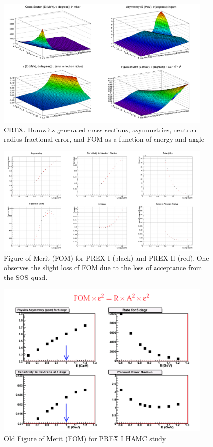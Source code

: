 \documentclass[11pt]{amsart}
\begin{document}
\begin{figure}
  \includegraphics[width=0.95\textwidth]{plots/contour_c.png}
  \caption{CREX: Horowitz generated cross sections, asymmetries, neutron radius fractional error, and FOM as a function of energy and angle}
\end{figure}

\begin{figure}
  \includegraphics[width=0.95\textwidth]{plots/fom_p.png}
  \caption{Figure of Merit (FOM) for PREX I (black) and PREX II (red). One observes the slight loss of FOM due to the loss of acceptance from the SOS quad.}
\end{figure}

\begin{figure}
  \includegraphics[width=0.95\textwidth]{plots/fom_old.png}
  \caption{Old Figure of Merit (FOM) for PREX I HAMC study}
\end{figure}
\end{document}
